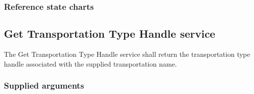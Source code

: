 \begin{compactstdpage}

    \subsubsection{Reference state charts}


    \subsection{Get Transportation Type Handle service}

    The Get Transportation Type Handle service shall return the transportation type handle associated with the supplied transportation name.

    \subsubsection{Supplied arguments}

\end{compactstdpage}

\clearpage

